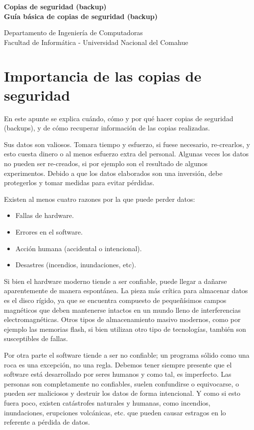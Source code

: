 \documentclass[12pt]{article}
\def\maketitle{

 \makeatletter
 {\color{bl} \centering \huge \sc \textbf{
 Copias de seguridad (backup)\\ 
\large \vspace*{-8pt} \color{black} Guía básica de copias de seguridad (backup)
 \vspace*{8pt} }\par}
 \makeatother


 \makeatletter
 {\centering \small 
 	Departamento de Ingeniería de Computadoras \\
 	Facultad de Informática - Universidad Nacional del Comahue \\
 	\vspace{20pt} }
 \makeatother

}
\begin{document}
\thispagestyle{empty}
\maketitle
\setlength{\parindent}{0pt}


\section*{Importancia de las copias de seguridad}
 En este apunte se explica cuándo, cómo y  por qué hacer copias de 
seguridad (backups), y de cómo recuperar información de las 
copias realizadas.

Sus datos son valiosos. Tomara tiempo y esfuerzo, si fuese necesario,
re-crearlos, y esto cuesta dinero o al menos esfuerzo extra del personal.
Algunas veces los datos no pueden ser re-creados, si por ejemplo son el 
resultado de algunos experimentos. Debido a que los datos elaborados son una 
inversión, debe protegerlos y tomar medidas para evitar pérdidas.

Existen al menos cuatro razones por la que puede perder datos: 
\begin{itemize}
\item Fallas de hardware.
\item Errores en el software. 
\item Acción humana (accidental o intencional). 
\item Desastres (incendios, inundaciones, etc). 
\end{itemize}

Si bien el hardware moderno tiende a ser confiable, puede llegar a dañarse
aparentemente de manera espontánea. La pieza más crítica para 
almacenar datos es el disco rígido, ya que se encuentra compuesto de 
pequeñísimos campos magnéticos que deben mantenerse intactos en un mundo 
lleno de interferencias electromagnéticas. Otros tipos de almacenamiento 
masivo modernos, como por ejemplo las memorias flash, si bien utilizan 
otro tipo de tecnologías, también son susceptibles de fallas.  

Por otra parte el software tiende a ser no confiable; un programa 
sólido como una roca es una excepción, no una regla. Debemos tener siempre
presente que el software está desarrollado por seres humanos y como tal, es
imperfecto. Las personas son completamente no confiables, suelen confundirse
o equivocarse, o pueden ser maliciosos y destruir los datos de forma 
intencional. Y como si esto fuera poco, existen catástrofes naturales y
humanas, como incendios, inundaciones, erupciones volcánicas, etc. 
que pueden causar estragos en lo referente a pérdida de datos.  
\end{document}
